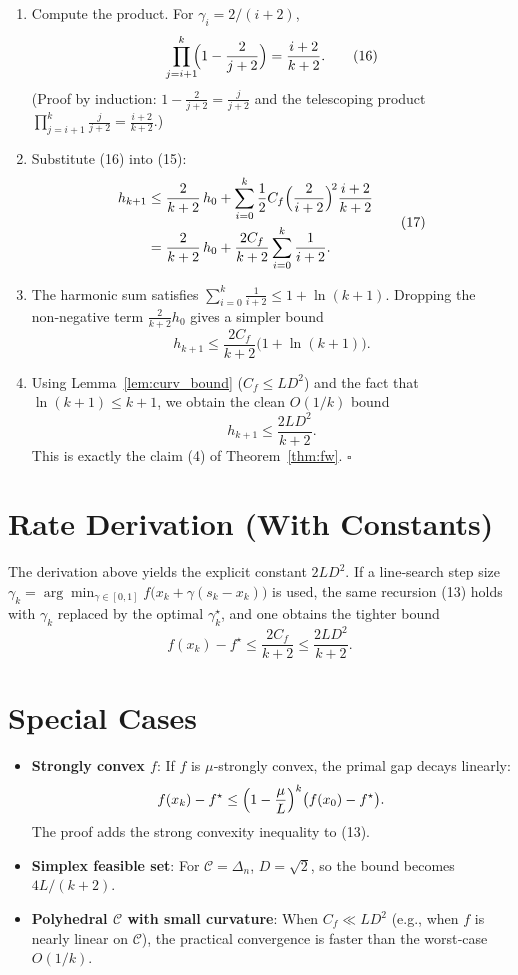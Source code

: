 \documentclass{article}
\begin{document}
\begin{enumerate}
\item[Step 7.] Compute the product. For $\gamma_i=2/(i+2)$,
\[
\prod_{j=i+1}^{k}\!\!\Bigl(1-\frac{2}{j+2}\Bigr)
= \frac{i+2}{k+2}.
\tag{16}
\]
(Proof by induction: $1-\frac{2}{j+2}= \frac{j}{j+2}$ and the telescoping product $\prod_{j=i+1}^{k}\frac{j}{j+2}= \frac{i+2}{k+2}$.)

\item[Step 8.] Substitute (16) into (15):
\[
\begin{aligned}
h_{k+1}
&\le \frac{2}{k+2}\,h_0
   + \sum_{i=0}^{k}\frac{1}{2}C_f\Bigl(\frac{2}{i+2}\Bigr)^{\!2}\frac{i+2}{k+2}\\
&= \frac{2}{k+2}\,h_0
   + \frac{2C_f}{k+2}\sum_{i=0}^{k}\frac{1}{i+2}.
\end{aligned}
\tag{17}
\]

\item[Step 9.] The harmonic sum satisfies $\sum_{i=0}^{k}\frac{1}{i+2}\le 1+\ln(k+1)$. Dropping the non‑negative term $\frac{2}{k+2}h_0$ gives a simpler bound
\[
h_{k+1}\le \frac{2C_f}{k+2}\bigl(1+\ln(k+1)\bigr).
\tag{18}
\]

\item[Step 10.] Using Lemma~\ref{lem:curv_bound} ($C_f\le LD^{2}$) and the fact that $\ln(k+1)\le k+1$, we obtain the clean $O(1/k)$ bound
\[
h_{k+1}\le \frac{2LD^{2}}{k+2}.
\tag{19}
\]
This is exactly the claim (4) of Theorem~\ref{thm:fw}. \hfill$\square$
\end{enumerate}

\section*{Rate Derivation (With Constants)}
The derivation above yields the explicit constant $2LD^{2}$.
If a line‑search step size $\gamma_k = \arg\min_{\gamma\in[0,1]} f\bigl(x_k+\gamma(s_k-x_k)\bigr)$ is used, the same recursion (13) holds with $\gamma_k$ replaced by the optimal $\gamma_k^{\star}$, and one obtains the tighter bound
\[
f(x_{k})-f^\star \le \frac{2C_f}{k+2}\le \frac{2LD^{2}}{k+2}.
\]

\section*{Special Cases}
\begin{itemize}
    \item \textbf{Strongly convex $f$}: If $f$ is $\mu$‑strongly convex, the primal gap decays linearly:
    \[
    f(x_k)-f^\star \le \Bigl(1-\frac{\mu}{L}\Bigr)^{k}\bigl(f(x_0)-f^\star\bigr).
    \]
    The proof adds the strong convexity inequality to (13).
    \item \textbf{Simplex feasible set}: For $\mathcal{C}=\Delta_{n}$, $D=\sqrt{2}$, so the bound becomes $4L/(k+2)$.
    \item \textbf{Polyhedral $\mathcal{C}$ with small curvature}: When $C_f\ll LD^{2}$ (e.g., when $f$ is nearly linear on $\mathcal{C}$), the practical convergence is faster than the worst‑case $O(1/k)$.
\end{itemize}
\end{document}
